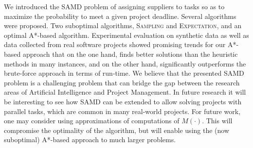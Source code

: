 \documentclass[letterpaper]{article} %
\newcommand{\samd}{\ac{SAMD}\xspace}
\newcommand{\astar}{\textsc{A*}\xspace}
\newcommand{\sampling}{\textsc{Sampling}\xspace}
\newcommand{\expectation}{\textsc{Expectation}\xspace}
\begin{document}
We introduced the \samd problem of assigning suppliers to tasks so as to maximize the probability to meet a given project deadline. Several algorithms were proposed. Two suboptimal algorithms, \sampling and \expectation, and an optimal \astar-based algorithm. %
Experimental evaluation on synthetic data as well as data collected from real software projects showed promising trends for our \astar-based approach that on the one hand, finds better solutions than the heuristic methods in many instances, and on the other hand, significantly outperforms the brute-force approach in terms of run-time.
We believe that the presented \samd problem is a challenging problem that can bridge the gap between the research areas of Artificial Intelligence and Project Management. In future research it will be interesting to see how \samd can be extended to allow solving projects with parallel tasks, which are common in many real-world projects.
For future work, one may consider using approximations of computations of $M(\cdot)$.
This will compromise the optimality of the algorithm, but will enable using the (now suboptimal) \astar-based approach to much larger problems.
\end{document}

